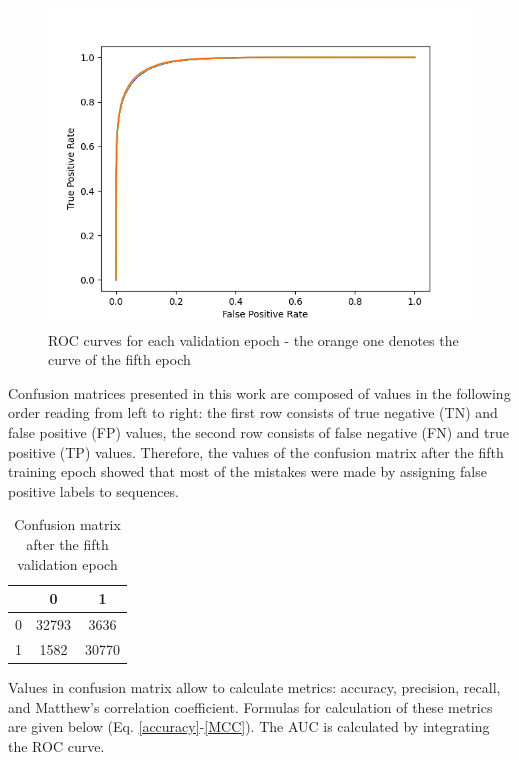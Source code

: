 \documentclass[12pt]{article}
\begin{document}
	\begin{figure}[h!]
		\centering
		\includegraphics[scale=0.7]{validation_4_2713.png}

		\caption{ ROC curves for each validation epoch - the orange 
		one denotes the curve of the fifth epoch}
		\label{figure:SLP003validation4}
	\end{figure}

	Confusion matrices presented in this work are composed of values in the
	following order reading from left to right: the first row consists of true 
	negative (TN) and false positive (FP) values, the second row consists of 
	false negative (FN) and true positive (TP) values.
	Therefore, the values of the confusion matrix after the fifth training epoch
	showed that most of the mistakes were made by assigning false positive 
	labels to sequences.

	\begin{table}[h!]
		\caption{Confusion matrix after the fifth validation epoch}
		\vspace{0.2cm}
		\centering
		\begin{tabular}{ | c | c c | }
			\hline 
			& 0 & 1 \\
			\hline  
			0 & 32793 & 3636 \\
			1 & 1582 & 30770 \\
			\hline    
		\end{tabular}
		\label{table:SLP003confusionMatrixValidation4}
	\end{table}

	Values in confusion matrix allow to calculate metrics: accuracy, precision, 
	recall, and Matthew's correlation coefficient. Formulas for calculation of these metrics are given below 
	(Eq. \ref{accuracy}-\ref{MCC}).
	The AUC is calculated by integrating the ROC curve. 
\end{document}
